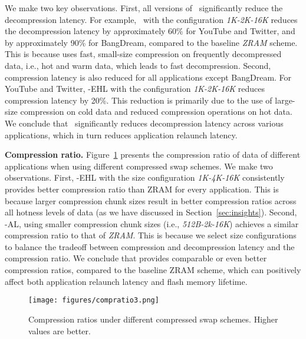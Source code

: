 We make two key observations.
First, all versions of \proposal\ significantly reduce the decompression latency. For example, \proposal\ with the configuration \emph{1K-2K-16K} reduces the decompression latency by approximately 60\% for YouTube and Twitter, and by approximately 90\% for BangDream, compared to the baseline \emph{ZRAM} scheme. This is because  \proposal uses fast, small-size compression on frequently decompressed data, i.e.,  hot and warm data, which leads to fast decompression. 
Second, compression latency is also reduced for all applications except BangDream. For YouTube and Twitter, \proposal-EHL with the configuration \emph{1K-2K-16K} reduces compression latency by 20\%. This reduction is primarily due to the use of large-size compression on cold data and reduced compression operations on hot data.
We conclude that \proposal\ significantly reduces decompression latency across various applications, which in turn reduces application relaunch latency.


\noindent\textbf{Compression ratio.}  Figure~\ref{fig:compression-ratio-result} presents the compression ratio of data of different applications when using different compressed swap schemes. 
We make two observations. First, \proposal-EHL with the size configuration \emph{1K-4K-16K} consistently provides better compression ratio than ZRAM for every application. This is because larger compression chunk sizes result in better compression ratios across all hotness levels of data (as we have discussed in Section~\ref{sec:insights}). 
Second, \proposal-AL, using smaller compression chunk sizes (i.e., \emph{512B-2k-16K}) achieves a similar compression ratio to that of \emph{ZRAM}. This is because we select size configurations to balance the tradeoff between compression and decompression latency and the compression ratio. We conclude that \proposal provides comparable or even better compression ratios, compared to the baseline ZRAM scheme, which can positively affect both application relaunch latency and flash memory lifetime.


\begin{figure}[!h]
\centering
\texttt{[image: figures/compratio3.png]}
\caption{Compression ratios under different compressed swap schemes. Higher values are better.}
\label{fig:compression-ratio-result}
\end{figure}


